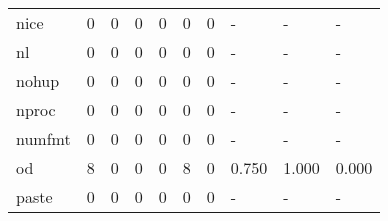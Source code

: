 \begin{longtable}{lp{2.0cm}p{2.0cm}p{2.0cm}p{2.0cm}p{2.0cm}p{2.0cm}p{2.0cm}p{2.0cm}p{2.0cm}}
nice      &                      0 &                                             0 &                                            0 &                                           0 &                                            0 &                                          0 &                                    - &                                      - &                                    - \\
nl        &                      0 &                                             0 &                                            0 &                                           0 &                                            0 &                                          0 &                                    - &                                      - &                                    - \\
nohup     &                      0 &                                             0 &                                            0 &                                           0 &                                            0 &                                          0 &                                    - &                                      - &                                    - \\
nproc     &                      0 &                                             0 &                                            0 &                                           0 &                                            0 &                                          0 &                                    - &                                      - &                                    - \\
numfmt    &                      0 &                                             0 &                                            0 &                                           0 &                                            0 &                                          0 &                                    - &                                      - &                                    - \\
od        &                      8 &                                             0 &                                            0 &                                           0 &                                            8 &                                          0 &                                0.750 &                                  1.000 &                                0.000 \\
paste     &                      0 &                                             0 &                                            0 &                                           0 &                                            0 &                                          0 &                                    - &                                      - &                                    - \\

\end{longtable}

